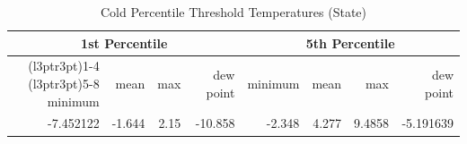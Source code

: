 \begin{table}
\centering
\caption{\label{tab:state_temp_threshold_cold}Cold Percentile Threshold Temperatures (State)}
\centering
\begin{tabular}[t]{rrrrrrrr}
\toprule
\multicolumn{4}{c}{1st Percentile} & \multicolumn{4}{c}{5th Percentile} \\
\cmidrule(l{3pt}r{3pt}){1-4} \cmidrule(l{3pt}r{3pt}){5-8}
minimum & mean & max & dew point & minimum & mean & max & dew point\\
\midrule
-7.452122 & -1.644 & 2.15 & -10.858 & -2.348 & 4.277 & 9.4858 & -5.191639\\
\bottomrule
\end{tabular}
\end{table}
